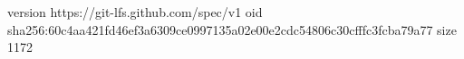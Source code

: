 version https://git-lfs.github.com/spec/v1
oid sha256:60c4aa421fd46ef3a6309ce0997135a02e00e2cdc54806c30cfffc3fcba79a77
size 1172
